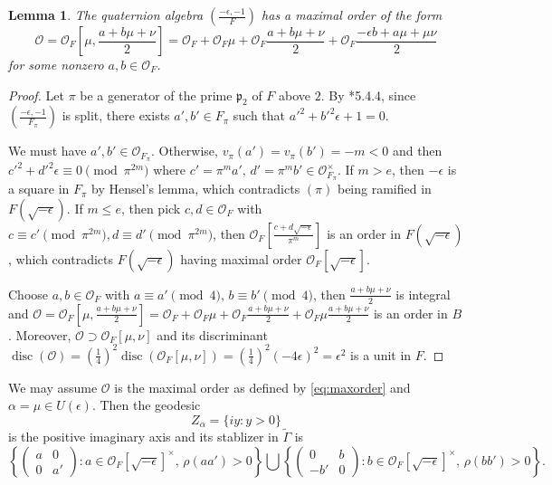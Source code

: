 \documentclass{amsart}
\numberwithin{equation}{subsection}
\numberwithin{theorem}{section}
\newtheorem{lemma}[theorem]{Lemma}
\theoremstyle{definition}
\theoremstyle{remark}
\newcommand{\cO}{\mathcal{O}}
\newcommand{\fp}{\mathfrak{p}}
\DeclareMathOperator{\disc}{disc}
\begin{document}
\begin{lemma}
    The quaternion algebra $\left(\frac{-\epsilon, -1}{F}\right)$ %
    has a maximal order of the form \begin{equation} \label{eq:maxorder}
        \cO = \cO_F[\mu, \frac{a+b\mu+\nu}{2}] = \cO_F + \cO_F\mu +\cO_F\frac{a+b\mu+\nu}{2} + \cO_F\frac{-\epsilon b+a\mu+\mu\nu}{2}
    \end{equation} for some nonzero $a, b\in \cO_F$. 
\end{lemma}
\begin{proof}
    Let $\pi$ be a generator of the prime $\fp_2$ of $F$ above $2. $
    By \cite{MR4279905}*{5.4.4}, since $\left(\frac{-\epsilon, -1}{F_{\pi}}\right)$ is split, there exists $a', b'\in F_{\pi}$ such that $a'^2+b'^2\epsilon + 1 =0$. 
    
    We must have $a', b'\in \cO_{F_{\pi}}$. Otherwise, $v_{\pi}(a') = v_{\pi}(b') = -m< 0$ and then $c'^2 + d'^2 \epsilon \equiv 0 \pmod{\pi^{2m}}$ where $c' = \pi^{m} a', \, d' =\pi^{m} b'\in \cO_{F_{\pi}}^\times$.
    If $m > e$, then $-\epsilon$ is a square in $F_\pi$ by Hensel's lemma, which contradicts $(\pi)$ being ramified in $F(\sqrt{-\epsilon})$. If $m\leq e$, then pick $c,d\in \cO_F$ with $c\equiv c'\pmod{\pi^{2m}}, d\equiv d'\pmod{\pi^{2m}}$, then $\cO_{F}[\frac{c+d\sqrt{-\epsilon}}{\pi^{m}} ]$ is an order in $F(\sqrt{-\epsilon})$, which contradicts $F(\sqrt{-\epsilon})$ having maximal order $\cO_{F}[\sqrt{-\epsilon}]$. 

    Choose $a, b\in \cO_F$ with $a\equiv a'\pmod{4}, \, b\equiv b'\pmod{4}$, then $\frac{a+b\mu+\nu}{2}$ is integral and $\cO = \cO_F[\mu, \frac{a+b\mu+\nu}{2}] = \cO_F + \cO_F\mu +\cO_F\frac{a+b\mu+\nu}{2} + \cO_F\mu\frac{a+b\mu+\nu}{2}$ is an order in $B$. Moreover, $\cO \supset \cO_F[\mu,\nu]$ and its discriminant $\disc(\cO) = (\frac{1}{4})^2\disc(\cO_F[\mu,\nu]) = (\frac{1}{4})^2(-4\epsilon)^2 =\epsilon^2$ is a unit in $F$. 
\end{proof}
We may assume $\cO$ is the maximal order as defined by \eqref{eq:maxorder} and $\alpha = \mu \in U(\epsilon)$. Then the geodesic \begin{equation} \label{eq:imagaxis}
    Z_{\alpha} = \{iy:y>0\}
\end{equation} is the positive imaginary axis and its stablizer in $\widetilde{\Gamma}$ is \[\left\{\begin{pmatrix}
    a & 0 \\ 0 & a'
\end{pmatrix}: a \in \mathcal{O}_F[\sqrt{-\epsilon}]^\times,\, \rho(aa')>0\right\} \bigcup \left\{\begin{pmatrix}
    0 & b \\ -b' & 0 
\end{pmatrix}: b \in \mathcal{O}_F[\sqrt{-\epsilon}]^\times, \, \rho(bb')>0\right\}.\]
\end{document}
